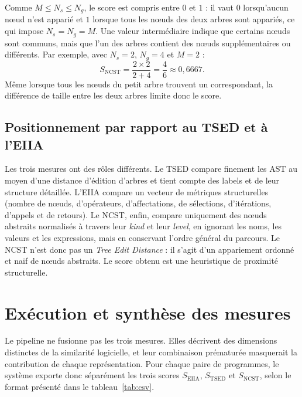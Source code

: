 \documentclass[12pt,a4paper,oneside]{report}
\begin{document}
Comme $M \leq N_s \leq N_g$, le score est compris entre $0$ et $1$ : il vaut
$0$ lorsqu'aucun nœud n'est apparié et $1$ lorsque tous les nœuds des deux
arbres sont appariés, ce qui impose $N_s = N_g = M$. Une valeur intermédiaire
indique que certains nœuds sont communs, mais que l'un des arbres contient des
nœuds supplémentaires ou différents. Par exemple, avec $N_s = 2$, $N_g = 4$ et
$M = 2$ :
\begin{equation}
S_{\mathrm{NCST}} = \frac{2\times 2}{2+4} = \frac{4}{6} \approx 0{,}6667.
\end{equation}
Même lorsque tous les nœuds du petit arbre trouvent un correspondant, la
différence de taille entre les deux arbres limite donc le score.

\subsection{Positionnement par rapport au TSED et à l'EIIA}

Les trois mesures ont des rôles différents. Le TSED compare finement les AST au
moyen d'une distance d'édition d'arbres et tient compte des labels et de leur
structure détaillée. L'EIIA compare un vecteur de métriques structurelles
(nombre de nœuds, d'opérateurs, d'affectations, de sélections, d'itérations,
d'appels et de retours). Le NCST, enfin, compare uniquement des nœuds abstraits
normalisés à travers leur \emph{kind} et leur \emph{level}, en ignorant les
noms, les valeurs et les expressions, mais en conservant l'ordre général du
parcours. Le NCST n'est donc pas un \emph{Tree Edit Distance} : il s'agit d'un
appariement ordonné et naïf de nœuds abstraits. Le score obtenu est une
heuristique de proximité structurelle.

\section{Exécution et synthèse des mesures}

Le pipeline ne fusionne pas les trois mesures. Elles décrivent des dimensions
distinctes de la similarité logicielle, et leur combinaison prématurée
masquerait la contribution de chaque représentation. Pour chaque paire de
programmes, le système exporte donc séparément les trois scores
$S_{\mathrm{EIIA}}$, $S_{\mathrm{TSED}}$ et $S_{\mathrm{NCST}}$, selon le
format présenté dans le tableau~\ref{tab:csv}.
\end{document}
